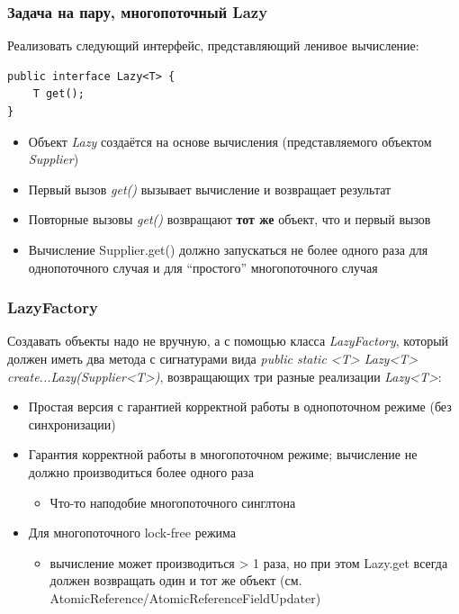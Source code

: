 \documentclass[xetex,mathserif,serif]{beamer}
\begin{document}
	\begin{frame}[fragile]
		\frametitle{Задача на пару, многопоточный Lazy}
		Реализовать следующий интерфейс, представляющий ленивое вычисление:
		
		\begin{verbatim}
public interface Lazy<T> {
    T get();
}
		\end{verbatim}

		\begin{itemize}
			\item Объект \textit{Lazy} создаётся на основе вычисления (представляемого объектом \textit{Supplier})
			\item Первый вызов \textit{get()} вызывает вычисление и возвращает результат
			\item Повторные вызовы \textit{get()} возвращают \textbf{тот же} объект, что и первый вызов
			\item Вычисление Supplier.get() должно запускаться не более одного раза для однопоточного случая и для ``простого'' многопоточного случая
		\end{itemize}
	\end{frame}

	\begin{frame}
		\frametitle{LazyFactory}
		Создавать объекты надо не вручную, а с помощью класса \textit{LazyFactory}, который должен
		иметь два метода с сигнатурами вида \textit{public static <T> Lazy<T> 
		create...Lazy(Supplier<T>)}, возвращающих три разные реализации \textit{Lazy<T>}:
		\begin{itemize}
			\item Простая версия с гарантией корректной работы в однопоточном режиме (без синхронизации)
			\item Гарантия корректной работы в многопоточном режиме; вычисление не должно производиться более одного раза
			\begin{itemize}
				\item Что-то наподобие многопоточного синглтона
			\end{itemize}
			\item Для многопоточного lock-free режима
			\begin{itemize}
				\item вычисление может производиться > 1 раза, но при этом Lazy.get всегда должен возвращать один и тот же объект (см. AtomicReference/AtomicReferenceFieldUpdater)
			\end{itemize}
		\end{itemize}
	\end{frame}
	
\end{document}
